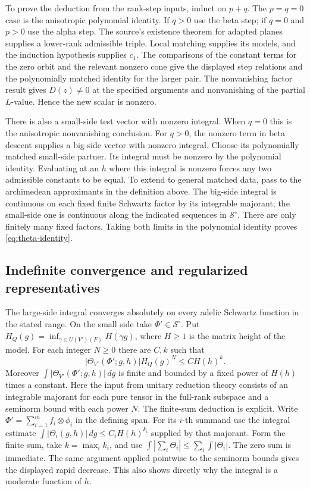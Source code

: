To prove the deduction from the rank-step inputs, induct on \(p+q\).
The \(p=q=0\) case is the anisotropic polynomial identity. If \(q>0\)
use the beta step; if \(q=0\) and \(p>0\) use the alpha step.
The source's existence theorem for adapted planes supplies a
lower-rank admissible triple. Local matching supplies its models,
and the induction hypothesis supplies \(c_1\).
The comparisons of the constant terms for the zero orbit and
the relevant nonzero cone give the displayed step relations and
the polynomially matched identity for the larger pair. The
nonvanishing factor result gives \(D(z)\ne0\) at the specified
arguments and nonvanishing of the partial \(L\)-value.
Hence the new scalar is nonzero.

There is also a small-side test vector with nonzero integral.
When \(q=0\) this is the anisotropic nonvanishing conclusion.
For \(q>0\), the nonzero term in beta descent supplies a big-side
vector with nonzero integral. Choose its polynomially matched
small-side partner. Its integral must be nonzero by the polynomial
identity. Evaluating at an \(h\) where this integral is nonzero
forces any two admissible constants to be equal. To extend to
general matched data, pass to the archimedean approximants in
the definition above. The big-side integral is continuous on
each fixed finite Schwartz factor by its integrable majorant;
the small-side one is continuous along the indicated sequences
in \(\mathcal S^\circ\). There are only finitely many fixed
factors. Taking both limits in the polynomial identity proves
\eqref{eq:theta-identity}.

\subsection{Indefinite convergence and regularized representatives}

The large-side integral converges absolutely on every adelic
Schwartz function in the stated range. On the small side take
\(\Phi'\in\mathcal S^\circ\). Put \(H_Q(g)=\inf_{\gamma\in U(V')(F)}
H(\gamma g)\), where \(H\geq1\) is the matrix height of the model.
For each integer \(N\geq0\) there are \(C,k\) such that
\[
 |\Theta_{V'}(\Phi';g,h)|H_Q(g)^N\leq C H(h)^k .
\]
Moreover \(\int|\Theta_{V'}(\Phi';g,h)|\,dg\) is finite and bounded
by a fixed power of \(H(h)\) times a constant. Here the input from
unitary reduction theory consists of an integrable majorant for
each pure tensor in the full-rank subspace and a seminorm bound
with each power \(N\). The finite-sum deduction is explicit.
Write \(\Phi'=\sum_{i=1}^m f_i\otimes\phi_i\) in the defining span.
For its \(i\)-th summand use the integral estimate
\(\int|\Theta_i(g,h)|\,dg\leq C_i H(h)^{k_i}\) supplied by that
majorant. Form the finite sum, take \(k=\max_i k_i\), and use
\(\int|\sum_i\Theta_i|\leq\sum_i\int|\Theta_i|\).
The zero sum is immediate. The same argument applied pointwise to
the seminorm bounds gives the displayed rapid decrease. This also
shows directly why the integral is a moderate function of \(h\).

